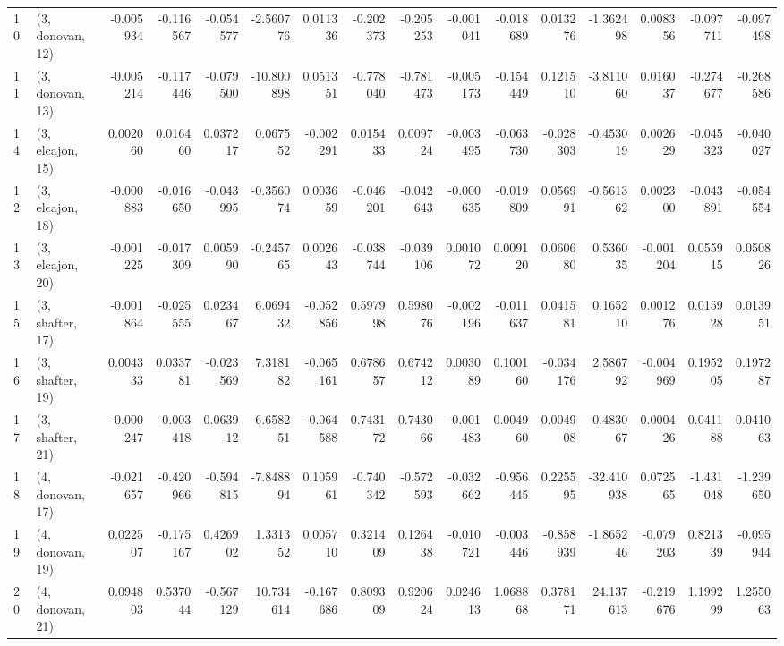 \begin{tabular}{llrrrrrrrrrrrrrr}
10 &  (3, donovan, 12) &  -0.005934 & -0.116567 & -0.054577 &  -2.560776 &  0.011336 &  -0.202373 & -0.205253 & -0.001041 & -0.018689 &  0.013276 &  -1.362498 &  0.008356 & -0.097711 & -0.097498 \\
11 &  (3, donovan, 13) &  -0.005214 & -0.117446 & -0.079500 & -10.800898 &  0.051351 &  -0.778040 & -0.781473 & -0.005173 & -0.154449 &  0.121510 &  -3.811060 &  0.016037 & -0.274677 & -0.268586 \\
14 &  (3, elcajon, 15) &   0.002060 &  0.016460 &  0.037217 &   0.067552 & -0.002291 &   0.015433 &  0.009724 & -0.003495 & -0.063730 & -0.028303 &  -0.453019 &  0.002629 & -0.045323 & -0.040027 \\
12 &  (3, elcajon, 18) &  -0.000883 & -0.016650 & -0.043995 &  -0.356074 &  0.003659 &  -0.046201 & -0.042643 & -0.000635 & -0.019809 &  0.056991 &  -0.561362 &  0.002300 & -0.043891 & -0.054554 \\
13 &  (3, elcajon, 20) &  -0.001225 & -0.017309 &  0.005990 &  -0.245765 &  0.002643 &  -0.038744 & -0.039106 &  0.001072 &  0.009120 &  0.060680 &   0.536035 & -0.001204 &  0.055915 &  0.050826 \\
15 &  (3, shafter, 17) &  -0.001864 & -0.025555 &  0.023467 &   6.069432 & -0.052856 &   0.597998 &  0.598076 & -0.002196 & -0.011637 &  0.041581 &   0.165210 &  0.001276 &  0.015928 &  0.013951 \\
16 &  (3, shafter, 19) &   0.004333 &  0.033781 & -0.023569 &   7.318182 & -0.065161 &   0.678657 &  0.674212 &  0.003089 &  0.100160 & -0.034176 &   2.586792 & -0.004969 &  0.195205 &  0.197287 \\
17 &  (3, shafter, 21) &  -0.000247 & -0.003418 &  0.063912 &   6.658251 & -0.064588 &   0.743172 &  0.743066 & -0.001483 &  0.004960 &  0.004908 &   0.483067 &  0.000426 &  0.041188 &  0.041063 \\
18 &  (4, donovan, 17) &  -0.021657 & -0.420966 & -0.594815 &  -7.848894 &  0.105961 &  -0.740342 & -0.572593 & -0.032662 & -0.956445 &  0.225595 & -32.410938 &  0.072565 & -1.431048 & -1.239650 \\
19 &  (4, donovan, 19) &   0.022507 & -0.175167 &  0.426902 &   1.331352 &  0.005710 &   0.321409 &  0.126438 & -0.010721 & -0.003446 & -0.858939 &  -1.865246 & -0.079203 &  0.821339 & -0.095944 \\
20 &  (4, donovan, 21) &   0.094803 &  0.537044 & -0.567129 &  10.734614 & -0.167686 &   0.809309 &  0.920624 &  0.024613 &  1.068868 &  0.378171 &  24.137613 & -0.219676 &  1.199299 &  1.255063 \\

\end{tabular}

